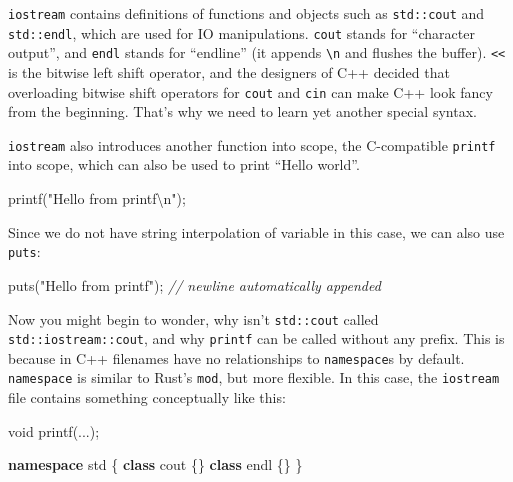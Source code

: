 \documentclass[
]{book}
\newenvironment{Shaded}{\begin{snugshade}}{\end{snugshade}}
\newcommand{\CommentTok}[1]{\textcolor[rgb]{0.56,0.35,0.01}{\textit{#1}}}
\newcommand{\DataTypeTok}[1]{\textcolor[rgb]{0.13,0.29,0.53}{#1}}
\newcommand{\KeywordTok}[1]{\textcolor[rgb]{0.13,0.29,0.53}{\textbf{#1}}}
\newcommand{\NormalTok}[1]{#1}
\newcommand{\SpecialCharTok}[1]{\textcolor[rgb]{0.00,0.00,0.00}{#1}}
\newcommand{\StringTok}[1]{\textcolor[rgb]{0.31,0.60,0.02}{#1}}
\begin{document}
\texttt{iostream} contains definitions of functions and objects such as \texttt{std::cout} and
\texttt{std::endl}, which are used for IO manipulations. \texttt{cout} stands for ``character
output'', and \texttt{endl} stands for ``endline'' (it appends \texttt{\textbackslash{}n} and flushes the buffer).
\texttt{\textless{}\textless{}} is the bitwise left shift operator, and the designers of C++ decided that
overloading bitwise shift operators for \texttt{cout} and \texttt{cin} can make C++ look fancy
from the beginning. That's why we need to learn yet another special syntax.

\texttt{iostream} also introduces another function into scope, the C-compatible \texttt{printf} into scope,
which can also be used to print ``Hello world''.

\begin{Shaded}
\begin{Highlighting}[]
\NormalTok{printf(}\StringTok{"Hello from printf}\SpecialCharTok{\textbackslash{}n}\StringTok{"}\NormalTok{);}
\end{Highlighting}
\end{Shaded}

Since we do not have string interpolation of variable in this case, we can also use \texttt{puts}:

\begin{Shaded}
\begin{Highlighting}[]
\NormalTok{puts(}\StringTok{"Hello from printf"}\NormalTok{); }\CommentTok{// newline automatically appended}
\end{Highlighting}
\end{Shaded}

Now you might begin to wonder, why isn't \texttt{std::cout} called \texttt{std::iostream::cout},
and why \texttt{printf} can be called without any prefix. This is because in C++ filenames
have no relationships to \texttt{namespace}s by default. \texttt{namespace} is similar to Rust's \texttt{mod},
but more flexible. In this case, the \texttt{iostream} file contains something conceptually like this:

\begin{Shaded}
\begin{Highlighting}[]
\DataTypeTok{void}\NormalTok{ printf(...);}

\KeywordTok{namespace}\NormalTok{ std \{}
    \KeywordTok{class}\NormalTok{ cout \{\}}
    \KeywordTok{class}\NormalTok{ endl \{\}}
\NormalTok{\}}
\end{Highlighting}
\end{Shaded}
\end{document}

